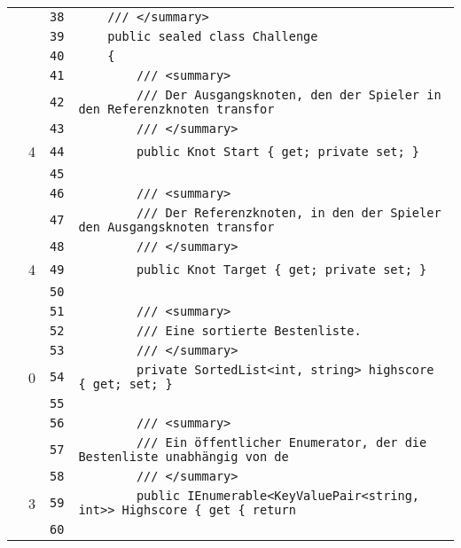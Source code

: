 \documentclass[a4paper,10pt]{article}
\begin{document}
\begin{longtable}[l]{lrrl}
\cellcolor{gray} &  & \verb~38~ & \verb~    /// </summary>~\\
\cellcolor{gray} &  & \verb~39~ & \verb~    public sealed class Challenge~\\
\cellcolor{gray} &  & \verb~40~ & \verb~    {~\\
\cellcolor{gray} &  & \verb~41~ & \verb~        /// <summary>~\\
\cellcolor{gray} &  & \verb~42~ & \verb~        /// Der Ausgangsknoten, den der Spieler in den Referenzknoten transfor~\\
\cellcolor{gray} &  & \verb~43~ & \verb~        /// </summary>~\\
\cellcolor{green} & 4 & \verb~44~ & \verb~        public Knot Start { get; private set; }~\\
\cellcolor{gray} &  & \verb~45~ & \verb~~\\
\cellcolor{gray} &  & \verb~46~ & \verb~        /// <summary>~\\
\cellcolor{gray} &  & \verb~47~ & \verb~        /// Der Referenzknoten, in den der Spieler den Ausgangsknoten transfor~\\
\cellcolor{gray} &  & \verb~48~ & \verb~        /// </summary>~\\
\cellcolor{green} & 4 & \verb~49~ & \verb~        public Knot Target { get; private set; }~\\
\cellcolor{gray} &  & \verb~50~ & \verb~~\\
\cellcolor{gray} &  & \verb~51~ & \verb~        /// <summary>~\\
\cellcolor{gray} &  & \verb~52~ & \verb~        /// Eine sortierte Bestenliste.~\\
\cellcolor{gray} &  & \verb~53~ & \verb~        /// </summary>~\\
\cellcolor{red} & 0 & \verb~54~ & \verb~        private SortedList<int, string> highscore { get; set; }~\\
\cellcolor{gray} &  & \verb~55~ & \verb~~\\
\cellcolor{gray} &  & \verb~56~ & \verb~        /// <summary>~\\
\cellcolor{gray} &  & \verb~57~ & \verb~        /// Ein öffentlicher Enumerator, der die Bestenliste unabhängig von de~\\
\cellcolor{gray} &  & \verb~58~ & \verb~        /// </summary>~\\
\cellcolor{green} & 3 & \verb~59~ & \verb~        public IEnumerable<KeyValuePair<string, int>> Highscore { get { return~\\
\cellcolor{gray} &  & \verb~60~ & \verb~~\\

\end{longtable}
\end{document}
